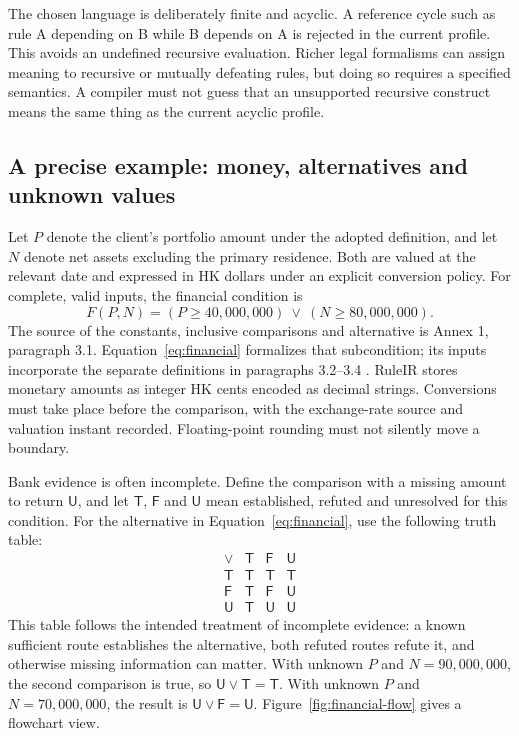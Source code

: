 \documentclass[12pt,a4paper,oneside,openany]{book}
\newcommand{\True}{\mathsf{T}}
\newcommand{\False}{\mathsf{F}}
\newcommand{\Unknown}{\mathsf{U}}
\begin{document}
The chosen language is deliberately finite and acyclic. A reference cycle such
as rule A depending on B while B depends on A is rejected in the current
profile. This avoids an undefined recursive evaluation. Richer legal formalisms
can assign meaning to recursive or mutually defeating rules, but doing so
requires a specified semantics. A compiler must not guess that an unsupported
recursive construct means the same thing as the current acyclic profile.

\subsection{A precise example: money, alternatives and unknown values}
\label{merge:P-03-product:03}

\label{sec:semantics}

Let $P$ denote the client's portfolio amount under the adopted definition, and
let $N$ denote net assets excluding the primary residence. Both are valued at the
relevant date and expressed in HK dollars under an explicit conversion policy.
For complete, valid inputs, the financial condition is
\begin{equation}
 F(P,N)=(P\geq 40{,}000{,}000)\ \lor\ (N\geq 80{,}000{,}000).
 \label{eq:financial}
\end{equation}
The source of the constants, inclusive comparisons and alternative is Annex 1,
paragraph 3.1. Equation~\eqref{eq:financial} formalizes that subcondition; its
inputs incorporate the separate definitions in paragraphs 3.2--3.4
\citep{sfcspiannex1}. RuleIR stores monetary amounts as
integer HK cents encoded as decimal strings. Conversions must take place
before the comparison, with the exchange-rate source and valuation instant
recorded. Floating-point rounding must not silently move a boundary.

Bank evidence is often incomplete. Define the comparison with a missing amount
to return $\Unknown$, and let $\True$, $\False$ and $\Unknown$ mean established,
refuted and unresolved for this condition. For the alternative in
Equation~\eqref{eq:financial}, use the following truth table:
\begin{equation}
\begin{array}{c|ccc}
\lor & \True & \False & \Unknown\\\hline
\True & \True & \True & \True\\
\False & \True & \False & \Unknown\\
\Unknown & \True & \Unknown & \Unknown
\end{array}
\label{eq:or}
\end{equation}
This table follows the intended treatment of incomplete evidence: a known
sufficient route establishes the alternative, both refuted routes refute it,
and otherwise missing information can matter. With unknown $P$ and
$N=90{,}000{,}000$, the second comparison is true, so
$\Unknown\lor\True=\True$. With unknown $P$ and $N=70{,}000{,}000$, the result
is $\Unknown\lor\False=\Unknown$. Figure~\ref{fig:financial-flow} gives a
flowchart view.
\end{document}
